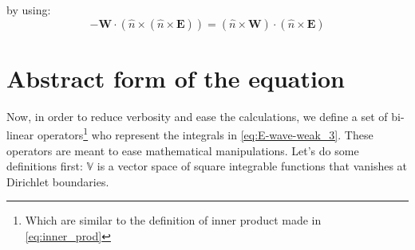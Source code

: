 by using:
$$-\mathbf{W}\cdot\left(\hat{n}\times \left( \hat{n}\times 
\mathbf{E} \right)\right)  = \left(\hat{n}\times \mathbf{W}\right)\cdot\left( \hat{n}\times 
\mathbf{E} \right) $$


\section{Abstract form of the equation}

Now, in order to reduce verbosity and ease the calculations, we define a set of bi-linear operators\footnote{Which are similar to the definition of inner product made in \ref{eq:inner_prod}} who represent the integrals in \ref{eq:E-wave-weak_3}. These operators are meant to ease mathematical manipulations. Let's do some definitions first:
$\mathbb{V}$ is a vector space of square integrable functions that vanishes at Dirichlet boundaries.

